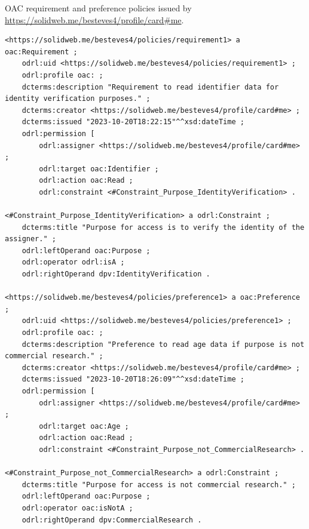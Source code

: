 \begin{listing}[htp]
\caption{OAC requirement and preference policies issued by \url{https://solidweb.me/besteves4/profile/card\#me}.}
\label{list:oac_req_pref}
\begin{verbatim}
<https://solidweb.me/besteves4/policies/requirement1> a oac:Requirement ;
    odrl:uid <https://solidweb.me/besteves4/policies/requirement1> ;
    odrl:profile oac: ;
    dcterms:description "Requirement to read identifier data for identity verification purposes." ;
    dcterms:creator <https://solidweb.me/besteves4/profile/card#me> ;
    dcterms:issued "2023-10-20T18:22:15"^^xsd:dateTime ;
    odrl:permission [
        odrl:assigner <https://solidweb.me/besteves4/profile/card#me> ;
        odrl:target oac:Identifier ;
        odrl:action oac:Read ;
        odrl:constraint <#Constraint_Purpose_IdentityVerification> .

<#Constraint_Purpose_IdentityVerification> a odrl:Constraint ;
    dcterms:title "Purpose for access is to verify the identity of the assigner." ;
    odrl:leftOperand oac:Purpose ;
    odrl:operator odrl:isA ;
    odrl:rightOperand dpv:IdentityVerification .

<https://solidweb.me/besteves4/policies/preference1> a oac:Preference ;
    odrl:uid <https://solidweb.me/besteves4/policies/preference1> ;
    odrl:profile oac: ;
    dcterms:description "Preference to read age data if purpose is not commercial research." ;
    dcterms:creator <https://solidweb.me/besteves4/profile/card#me> ;
    dcterms:issued "2023-10-20T18:26:09"^^xsd:dateTime ;
    odrl:permission [
        odrl:assigner <https://solidweb.me/besteves4/profile/card#me> ;
        odrl:target oac:Age ;
        odrl:action oac:Read ;
        odrl:constraint <#Constraint_Purpose_not_CommercialResearch> .

<#Constraint_Purpose_not_CommercialResearch> a odrl:Constraint ;
    dcterms:title "Purpose for access is not commercial research." ;
    odrl:leftOperand oac:Purpose ;
    odrl:operator oac:isNotA ;
    odrl:rightOperand dpv:CommercialResearch .
\end{verbatim}
\end{listing}

